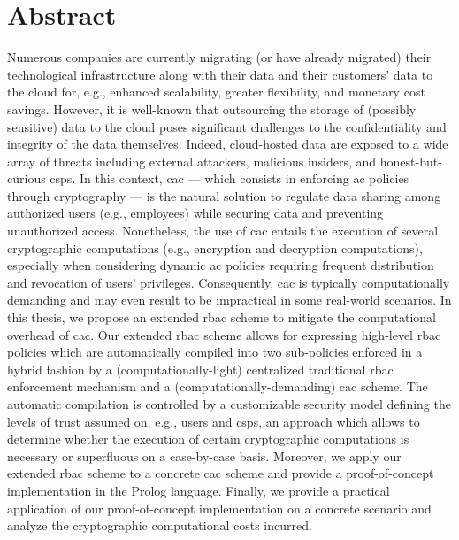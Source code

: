 \chapter*{Abstract}
\label{abstract}


Numerous companies are currently migrating (or have already migrated) their technological infrastructure along with their data and their customers' data to the cloud for, e.g., enhanced scalability, greater flexibility, and monetary cost savings. However, it is well-known that outsourcing the storage of (possibly sensitive) data to the cloud poses significant challenges to the confidentiality and integrity of the data themselves. Indeed, cloud-hosted data are exposed to a wide array of threats including external attackers, malicious insiders, and honest-but-curious \glspl{csp}.
%
In this context, \gls{cac} --- which consists in enforcing \gls{ac} policies through cryptography --- is the natural solution to regulate data sharing among authorized users (e.g., employees) while securing data and preventing unauthorized access. Nonetheless, the use of \gls{cac} entails the execution of several cryptographic computations (e.g., encryption and decryption computations), especially when considering dynamic \gls{ac} policies requiring frequent distribution and revocation of users' privileges. Consequently, \gls{cac} is typically computationally demanding and may even result to be impractical in some real-world scenarios.
%
In this thesis, we propose an extended \gls{rbac} scheme to mitigate the computational overhead of \gls{cac}. Our extended \gls{rbac} scheme allows for expressing high-level \gls{rbac} policies which are automatically compiled into two sub-policies enforced in a hybrid fashion by a (computationally-light) centralized traditional \gls{rbac} enforcement mechanism and a (computationally-demanding) \gls{cac} scheme. The automatic compilation is controlled by a customizable security model defining the levels of trust assumed on, e.g., users and \glspl{csp}, an approach which allows to determine whether the execution of certain cryptographic computations is necessary or superfluous on a case-by-case basis. Moreover, we apply our extended \gls{rbac} scheme to a concrete \gls{cac} scheme and provide a proof-of-concept implementation in the Prolog language. Finally, we provide a practical application of our proof-of-concept implementation on a concrete scenario and analyze the cryptographic computational costs incurred.

